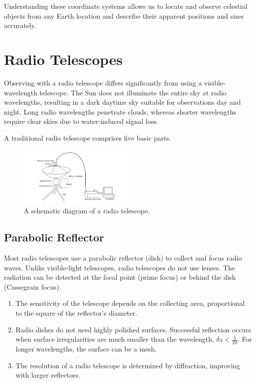 Understanding these coordinate systems allows us to locate and observe celestial objects from any Earth location and describe their apparent positions and sizes accurately.


\clearpage

\section{Radio Telescopes}

Observing with a radio telescope differs significantly from using a visible-wavelength telescope. The Sun does not illuminate the entire sky at radio wavelengths, resulting in a dark daytime sky suitable for observations day and night. Long radio wavelengths penetrate clouds, whereas shorter wavelengths require clear skies due to water-induced signal loss.

A traditional radio telescope comprises five basic parts.

\begin{figure}[H]
    \centering
    \includegraphics[width=0.5\textwidth]{Images/radio_telescope.png}
    \caption{A schematic diagram of a radio telescope.}
    \label{fig:radio_telescope}
\end{figure}

\subsection{Parabolic Reflector}
Most radio telescopes use a parabolic reflector (dish) to collect and focus radio waves. Unlike visible-light telescopes, radio telescopes do not use lenses. The radiation can be detected at the focal point (prime focus) or behind the dish (Cassegrain focus).

\begin{enumerate}
    \item The sensitivity of the telescope depends on the collecting area, proportional to the square of the reflector's diameter.
    \item Radio dishes do not need highly polished surfaces. Successful reflection occurs when surface irregularities are much smaller than the wavelength, \(\delta z < \frac{\lambda}{20}\). For longer wavelengths, the surface can be a mesh.
    \item The resolution of a radio telescope is determined by diffraction, improving with larger reflectors.
\end{enumerate}

